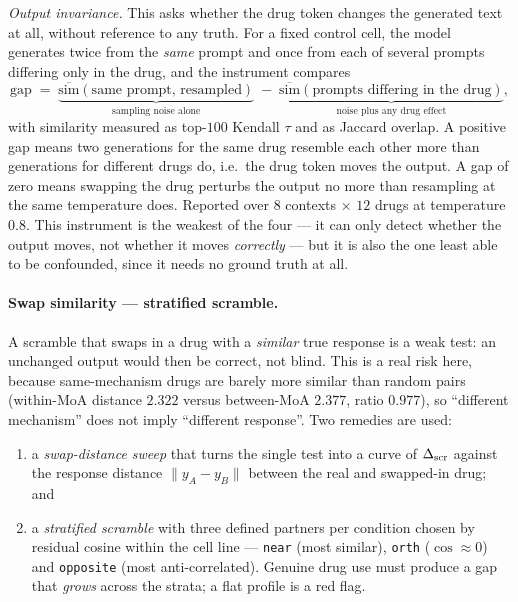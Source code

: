 \emph{Output invariance.} This asks whether the drug token changes the generated text at all,
without reference to any truth. For a fixed control cell, the model generates twice from the
\emph{same} prompt and once from each of several prompts differing only in the drug, and the
instrument compares
\begin{equation}
  \textrm{gap} \;=\; \underbrace{\overline{\textrm{sim}}(\textrm{same prompt, resampled})}_{\textrm{sampling noise alone}}
  \;-\; \underbrace{\overline{\textrm{sim}}(\textrm{prompts differing in the drug})}_{\textrm{noise plus any drug effect}},
\end{equation}
with similarity measured as top-$100$ Kendall $\tau$ and as Jaccard overlap. A positive gap means two
generations for the same drug resemble each other more than generations for different drugs do,
i.e.\ the drug token moves the output. A gap of zero means swapping the drug perturbs the output no
more than resampling at the same temperature does. Reported over $8$ contexts $\times$ $12$ drugs at
temperature $0.8$. This instrument is the weakest of the four --- it can only detect whether the
output moves, not whether it moves \emph{correctly} --- but it is also the one least able to be
confounded, since it needs no ground truth at all.

\paragraph{Swap similarity --- stratified scramble.} A scramble that swaps in a drug with a
\emph{similar} true response is a weak test: an unchanged output would then be correct, not blind.
This is a real risk here, because same-mechanism drugs are barely more similar than random pairs
(within-MoA distance $2.322$ versus between-MoA $2.377$, ratio $0.977$), so ``different mechanism''
does not imply ``different response''. Two remedies are used:
\begin{enumerate}
  \item a \emph{swap-distance sweep} that turns the single test into a curve of $\Delta_{\textrm{scr}}$ against the
        response distance $\lVert y_A - y_B \rVert$ between the real and swapped-in drug; and
  \item a \emph{stratified scramble} with three defined partners per condition chosen by residual
        cosine within the cell line --- \texttt{near} (most similar), \texttt{orth} ($\cos\approx0$)
        and \texttt{opposite} (most anti-correlated). Genuine drug use must produce a gap that
        \emph{grows} across the strata; a flat profile is a red flag.
\end{enumerate}

